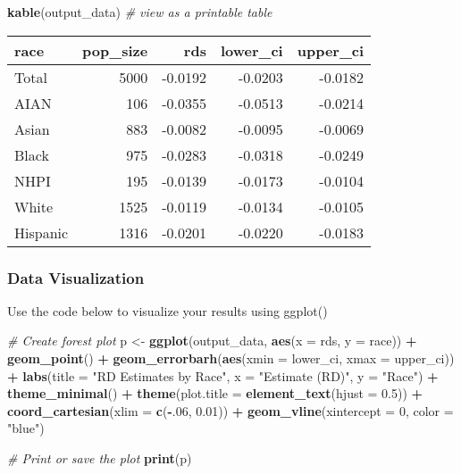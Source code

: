 \documentclass[
]{article}
\newenvironment{Shaded}{\begin{snugshade}}{\end{snugshade}}
\newcommand{\AttributeTok}[1]{\textcolor[rgb]{0.13,0.29,0.53}{#1}}
\newcommand{\CommentTok}[1]{\textcolor[rgb]{0.56,0.35,0.01}{\textit{#1}}}
\newcommand{\DecValTok}[1]{\textcolor[rgb]{0.00,0.00,0.81}{#1}}
\newcommand{\FloatTok}[1]{\textcolor[rgb]{0.00,0.00,0.81}{#1}}
\newcommand{\FunctionTok}[1]{\textcolor[rgb]{0.13,0.29,0.53}{\textbf{#1}}}
\newcommand{\NormalTok}[1]{#1}
\newcommand{\OtherTok}[1]{\textcolor[rgb]{0.56,0.35,0.01}{#1}}
\newcommand{\SpecialCharTok}[1]{\textcolor[rgb]{0.81,0.36,0.00}{\textbf{#1}}}
\newcommand{\StringTok}[1]{\textcolor[rgb]{0.31,0.60,0.02}{#1}}
\begin{document}
\begin{Shaded}
\begin{Highlighting}[]
\FunctionTok{kable}\NormalTok{(output\_data) }\CommentTok{\# view as a printable table}
\end{Highlighting}
\end{Shaded}

\begin{longtable}[]{@{}lrrrr@{}}
\toprule\noalign{}
race & pop\_size & rds & lower\_ci & upper\_ci \\
\midrule\noalign{}
\endhead
\bottomrule\noalign{}
\endlastfoot
Total & 5000 & -0.0192 & -0.0203 & -0.0182 \\
AIAN & 106 & -0.0355 & -0.0513 & -0.0214 \\
Asian & 883 & -0.0082 & -0.0095 & -0.0069 \\
Black & 975 & -0.0283 & -0.0318 & -0.0249 \\
NHPI & 195 & -0.0139 & -0.0173 & -0.0104 \\
White & 1525 & -0.0119 & -0.0134 & -0.0105 \\
Hispanic & 1316 & -0.0201 & -0.0220 & -0.0183 \\
\end{longtable}

\subsubsection{Data Visualization}\label{data-visualization}

Use the code below to visualize your results using ggplot()

\begin{Shaded}
\begin{Highlighting}[]
\CommentTok{\# Create forest plot}
\NormalTok{p }\OtherTok{\textless{}{-}} \FunctionTok{ggplot}\NormalTok{(output\_data, }\FunctionTok{aes}\NormalTok{(}\AttributeTok{x =}\NormalTok{ rds, }\AttributeTok{y =}\NormalTok{ race)) }\SpecialCharTok{+}
  \FunctionTok{geom\_point}\NormalTok{() }\SpecialCharTok{+}
  \FunctionTok{geom\_errorbarh}\NormalTok{(}\FunctionTok{aes}\NormalTok{(}\AttributeTok{xmin =}\NormalTok{ lower\_ci, }\AttributeTok{xmax =}\NormalTok{ upper\_ci)) }\SpecialCharTok{+}
  \FunctionTok{labs}\NormalTok{(}\AttributeTok{title =} \StringTok{"RD Estimates by Race"}\NormalTok{,}
       \AttributeTok{x =} \StringTok{"Estimate (RD)"}\NormalTok{, }\AttributeTok{y =} \StringTok{"Race"}\NormalTok{) }\SpecialCharTok{+}
  \FunctionTok{theme\_minimal}\NormalTok{() }\SpecialCharTok{+}
  \FunctionTok{theme}\NormalTok{(}\AttributeTok{plot.title =} \FunctionTok{element\_text}\NormalTok{(}\AttributeTok{hjust =} \FloatTok{0.5}\NormalTok{)) }\SpecialCharTok{+}
  \FunctionTok{coord\_cartesian}\NormalTok{(}\AttributeTok{xlim =} \FunctionTok{c}\NormalTok{(}\SpecialCharTok{{-}}\NormalTok{.}\DecValTok{06}\NormalTok{, }\FloatTok{0.01}\NormalTok{)) }\SpecialCharTok{+} 
    \FunctionTok{geom\_vline}\NormalTok{(}\AttributeTok{xintercept =} \DecValTok{0}\NormalTok{, }\AttributeTok{color =} \StringTok{"blue"}\NormalTok{)}

\CommentTok{\# Print or save the plot}
\FunctionTok{print}\NormalTok{(p)}
\end{Highlighting}
\end{Shaded}
\end{document}
